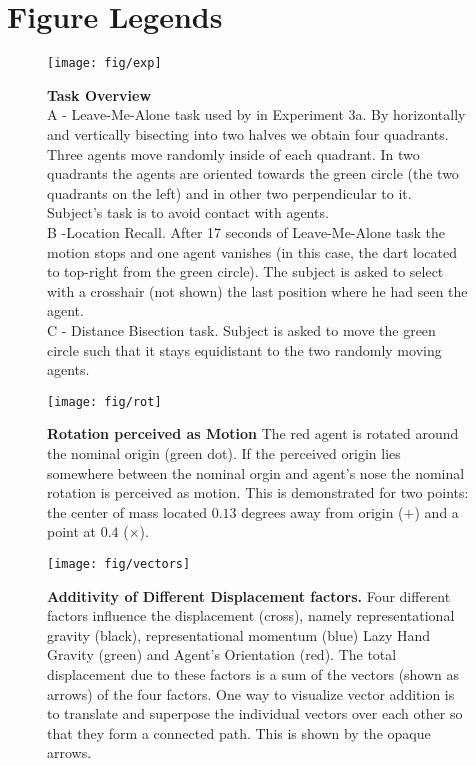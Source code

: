 \documentclass[10pt]{article}
\begin{document}


\section*{Figure Legends}
\begin{figure}[!ht]
\begin{center}
\texttt{[image: fig/exp]}
\end{center}
\caption{
{\bf Task Overview}\\
A - Leave-Me-Alone task used by \cite{gao10} in Experiment 3a. 
By horizontally and vertically bisecting into two halves we obtain four quadrants. 
Three agents move randomly inside of each quadrant. 
In two quadrants the agents are oriented towards the green circle (the two quadrants on the left) and in other two perpendicular to it. 
Subject's task is to avoid contact with agents. \\
B -Location Recall. 
After 17 seconds of Leave-Me-Alone task the motion stops and one agent vanishes (in this case, the dart located to top-right from the green circle). 
The subject is asked to select with a crosshair (not shown) the last position where he had seen the agent.\\ 
C - Distance Bisection task. 
Subject is asked to move the green circle such that it stays equidistant to the two randomly moving agents. 
}
\label{fig:exp}
\end{figure}

\begin{figure}[!ht]
\begin{center}
\texttt{[image: fig/rot]}
\end{center}
\caption{
{\bf Rotation perceived as Motion}
The red agent is rotated around the nominal origin (green dot). If the perceived origin lies somewhere between the nominal orgin and agent's nose the nominal rotation is perceived as motion. This is demonstrated for two points: the center of mass located $0.13$ degrees away from origin ($+$) and a point at $0.4$ ($\times$). 
}\label{fig:rot}
\end{figure}

\begin{figure}[!ht]
\begin{center}
\texttt{[image: fig/vectors]}
\end{center}
\caption{
{\bf Additivity of Different Displacement factors.}
Four different factors influence the displacement (cross), namely representational gravity (black), representational momentum (blue) Lazy Hand Gravity (green) and Agent's Orientation (red). The total displacement due to these factors is a sum of the vectors (shown as arrows) of the four factors. One way to visualize vector addition is to translate and superpose the individual vectors over each other so that they form a connected path. This is shown by the opaque arrows.  
}\label{fig:vec}
\end{figure}
\end{document}
